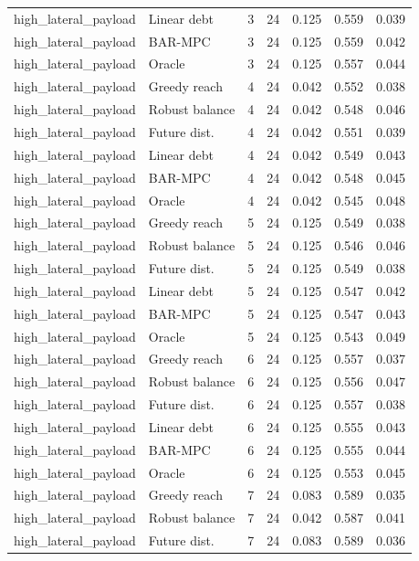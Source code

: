 \begin{longtable}{llrrrrr}
high\_lateral\_payload & Linear debt & 3 & 24 & 0.125 & 0.559 & 0.039 \\
high\_lateral\_payload & BAR-MPC & 3 & 24 & 0.125 & 0.559 & 0.042 \\
high\_lateral\_payload & Oracle & 3 & 24 & 0.125 & 0.557 & 0.044 \\
high\_lateral\_payload & Greedy reach & 4 & 24 & 0.042 & 0.552 & 0.038 \\
high\_lateral\_payload & Robust balance & 4 & 24 & 0.042 & 0.548 & 0.046 \\
high\_lateral\_payload & Future dist. & 4 & 24 & 0.042 & 0.551 & 0.039 \\
high\_lateral\_payload & Linear debt & 4 & 24 & 0.042 & 0.549 & 0.043 \\
high\_lateral\_payload & BAR-MPC & 4 & 24 & 0.042 & 0.548 & 0.045 \\
high\_lateral\_payload & Oracle & 4 & 24 & 0.042 & 0.545 & 0.048 \\
high\_lateral\_payload & Greedy reach & 5 & 24 & 0.125 & 0.549 & 0.038 \\
high\_lateral\_payload & Robust balance & 5 & 24 & 0.125 & 0.546 & 0.046 \\
high\_lateral\_payload & Future dist. & 5 & 24 & 0.125 & 0.549 & 0.038 \\
high\_lateral\_payload & Linear debt & 5 & 24 & 0.125 & 0.547 & 0.042 \\
high\_lateral\_payload & BAR-MPC & 5 & 24 & 0.125 & 0.547 & 0.043 \\
high\_lateral\_payload & Oracle & 5 & 24 & 0.125 & 0.543 & 0.049 \\
high\_lateral\_payload & Greedy reach & 6 & 24 & 0.125 & 0.557 & 0.037 \\
high\_lateral\_payload & Robust balance & 6 & 24 & 0.125 & 0.556 & 0.047 \\
high\_lateral\_payload & Future dist. & 6 & 24 & 0.125 & 0.557 & 0.038 \\
high\_lateral\_payload & Linear debt & 6 & 24 & 0.125 & 0.555 & 0.043 \\
high\_lateral\_payload & BAR-MPC & 6 & 24 & 0.125 & 0.555 & 0.044 \\
high\_lateral\_payload & Oracle & 6 & 24 & 0.125 & 0.553 & 0.045 \\
high\_lateral\_payload & Greedy reach & 7 & 24 & 0.083 & 0.589 & 0.035 \\
high\_lateral\_payload & Robust balance & 7 & 24 & 0.042 & 0.587 & 0.041 \\
high\_lateral\_payload & Future dist. & 7 & 24 & 0.083 & 0.589 & 0.036 \\

\end{longtable}
